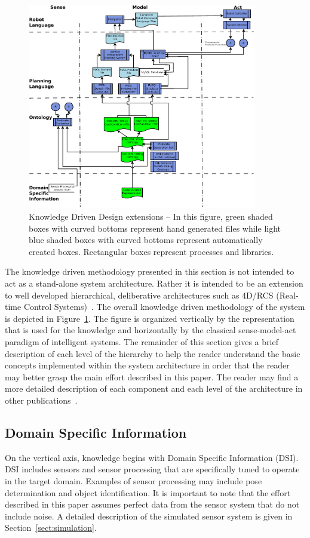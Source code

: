 \begin{figure}[!t!h!b!]
\centering
\includegraphics[width=10cm]{images/KnowledgeDrivenRobotics.pdf}
\caption{Knowledge Driven Design extensions -- In this figure, green shaded
  boxes with curved bottoms represent hand generated files while light blue
  shaded boxes with curved bottoms represent automatically created boxes.
  Rectangular boxes represent processes and libraries. }
\label{fig:methodology}
\end{figure}


The knowledge driven methodology presented in this section is not intended to act as a stand-alone system architecture. Rather it is intended to be an extension to well developed hierarchical, deliberative architectures such as 4D/RCS (Real-time Control Systems)~\cite{Albus2000}. The overall knowledge driven methodology of the system is depicted in Figure~\ref{fig:methodology}. The figure is organized vertically by the representation that is used for the knowledge and horizontally by the classical sense-model-act paradigm of intelligent systems. The remainder of this section gives a brief description of each level of the hierarchy to help the reader understand the basic concepts implemented within the system architecture in order that the reader may better grasp the main effort described in this paper. The reader may find a more detailed description of each component and each level of the architecture in other publications~\cite{BALAKIRSKY.IROS.2012}.

\subsection{Domain Specific Information}
\label{subsection:DSI}
On the vertical axis, knowledge begins with Domain Specific Information (DSI). DSI includes sensors and sensor processing that are specifically tuned to operate in the target domain. Examples of sensor processing may include pose determination and object identification. It is important to note that the effort described in this paper assumes perfect data from the sensor system that do not include noise. A detailed description of the simulated sensor system is given in Section~\ref{sect:simulation}.

